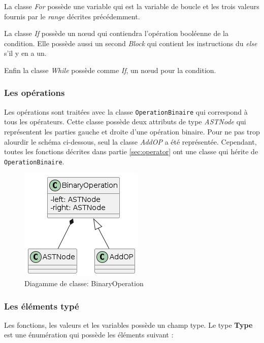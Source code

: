 \documentclass[a4paper]{article}%
\begin{document}
La classe \textit{For} possède une variable qui est la variable de boucle et les
trois valeurs fournis par le \textit{range} décrites précédemment.

La classe \textit{If} possède un nœud qui contiendra l'opération booléenne de la
condition. Elle possède aussi un second \textit{Block} qui contient les
instructions du \textit{else} s'il y en a un.

Enfin la classe \textit{While} possède comme \textit{If}, un nœud pour la
condition.

\subsubsection*{Les opérations}

Les opérations sont traitées avec la classe \lstinline{OperationBinaire} qui
correspond à tous les opérateurs. Cette classe possède deux attributs de type
\textit{ASTNode} qui représentent les parties gauche et droite d'une opération
binaire. Pour ne pas trop alourdir le schéma ci-dessous, seul la classe
\textit{AddOP} a été représentée. Cependant, toutes les fonctions décrites dans
partie \ref{sec:operator} ont une classe qui hérite de
\lstinline{OperationBinaire}.
\clearpage

\begin{figure}[h!]
  \begin{center}
  \includegraphics[scale=0.5]{../ressources/diagrams/binaryOp.png}
  \caption{Diagamme de classe: BinaryOperation}
  \end{center}
\end{figure}

\subsubsection*{Les éléments typé}
\label{sec:eltTypes}

Les fonctions, les valeurs et les variables possède un champ type. Le type
\textbf{Type} est une énumération qui possède les éléments suivant :
\end{document}
